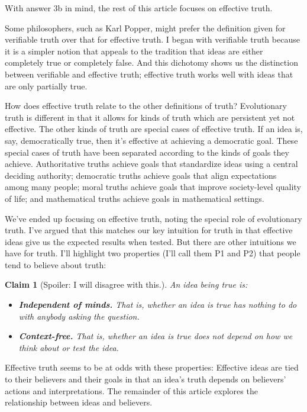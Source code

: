 \documentclass[11pt, oneside]{article}   	%
\newtheorem{claim}{Claim}
\begin{document}
With answer 3b in mind, the rest of this article focuses on effective truth.

Some philosophers, such as Karl Popper, might prefer the definition given for
verifiable truth over that for effective truth.
I began with verifiable truth because it is a simpler notion that appeals to the
tradition that ideas are either completely true or completely false.
And this dichotomy shows us the distinction between verifiable and effective
truth; effective truth works well with ideas that are only partially true.

How does effective truth relate to the other definitions of truth?
Evolutionary truth is different in that
it allows for kinds of truth which are persistent yet not effective.
The other kinds of truth are special cases of effective truth.
If an
idea is, say, democratically true, then it's effective at achieving a democratic
goal. These special cases of truth have been separated
according to the kinds of goals they achieve. Authoritative truths achieve goals
that standardize ideas using a central deciding authority; democratic truths
achieve goals that align expectations among many people; moral truths achieve
goals that improve society-level quality of life;
and mathematical truths achieve
goals in mathematical settings.

We've ended up focusing on effective truth, noting the special role of
evolutionary truth. I've argued that this matches our key intuition for truth in
that effective ideas give us the expected results when tested. But there are
other intuitions we have for truth. I'll highlight two properties (I'll call
them P1 and P2) that people tend to believe about truth:
\begin{claim}[Spoiler: I will disagree with this.]\label{c7}
    An idea being true is:
\begin{itemize}
    \item{} {\normalfont [{\bf P1.}]}
        {\bf Independent of minds.} That is, whether an idea is true has
        nothing to
        do with anybody asking the question.
    \item{} {\normalfont [{\bf P2.}]}
        {\bf Context-free.} That is, whether an idea is true does not depend
        on
        how we think about or test the idea.
\end{itemize}
\end{claim}
Effective truth seems to be at odds with these properties:
Effective ideas are tied to their believers and their goals in that
an idea's truth depends on believers' actions and interpretations.
The remainder of this
article explores the relationship between ideas and believers.
\end{document}
